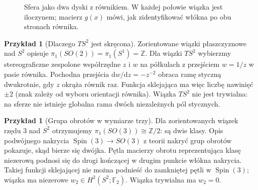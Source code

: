 \documentclass[11pt,a4paper,oneside]{report}
\newcommand{\Z}{\mathbb{Z}}
\newcommand{\dd}{\mathrm d}
\theoremstyle{plain}
\theoremstyle{definition}
\newtheorem{przyklad}[twierdzenie]{Przykład}
\theoremstyle{remark}
\begin{document}
\begin{figure}[htbp]
\centering
{}
\caption{Sfera jako dwa dyski z równikiem.
W każdej połowie wiązka jest iloczynem;
macierz $g(x)$ mówi, jak zidentyfikować
włókna po obu stronach równika.}
\label{fig:clutching-16}
\end{figure}

\begin{przyklad}[Dlaczego $TS^2$ jest skręcona]
Zorientowane wiązki płaszczyznowe
nad $S^2$ opisuje
$\pi_1(SO(2))=\pi_1(S^1)=\Z$.
Dla wiązki $TS^2$ wybierzmy
stereograficzne zespolone
współrzędne $z$ i $w$
na półkulach z przejściem
$w=1/z$ w pasie równika.
Pochodna przejścia
$\dd w/\dd z=-z^{-2}$
obraca ramę styczną
dwukrotnie, gdy $z$
okrąża równik raz.
Funkcja sklejająca ma
więc liczbę nawinięć
$\pm2$ (znak zależy
od wyboru orientacji
równika). Wiązka $TS^2$
nie jest trywialna:
na sferze nie istnieje
globalna rama dwóch
niezależnych pól stycznych.
\end{przyklad}

\begin{przyklad}[Grupa obrotów w wymiarze trzy]
Dla zorientowanych wiązek
rzędu $3$ nad $S^2$
otrzymujemy
$\pi_1(SO(3))\cong\Z/2$:
są dwie klasy.
Opis podwójnego nakrycia
$\operatorname{Spin}(3)\to SO(3)$
z teorii nakryć grup obrotów
pokazuje, skąd bierze się
dwójka. Pętla macierzy
obrotu reprezentująca
klasę niezerową podnosi
się do drogi kończącej
w drugim punkcie włókna
nakrycia. Takiej
funkcji sklejającej
nie można podnieść
do zamkniętej pętli
w $\operatorname{Spin}(3)$;
wiązka ma niezerowe
$w_2\in H^2(S^2;\mathbb F_2)$.
Wiązka trywialna ma
$w_2=0$.
\end{przyklad}
\end{document}
